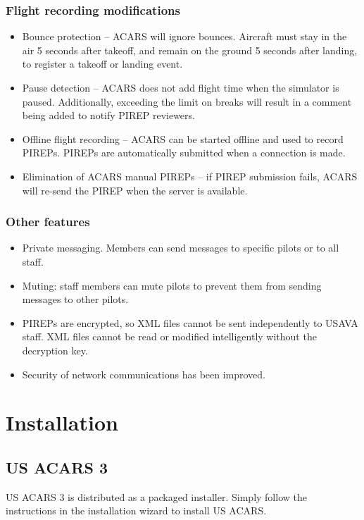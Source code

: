 \documentclass[12pt]{article}
\begin{document}
\subsubsection*{Flight recording modifications}
\begin{itemize}
\item{Bounce protection – ACARS will ignore bounces. Aircraft must stay in the air 5 seconds after takeoff, and remain on the ground 5 seconds after landing, to register a takeoff or landing event.}
\item{Pause detection – ACARS does not add flight time when the simulator is paused. Additionally, exceeding the limit on breaks will result in a comment being added to notify PIREP reviewers.}
\item{Offline flight recording – ACARS can be started offline and used to record PIREPs. PIREPs are automatically submitted when a connection is made.}
\item{Elimination of ACARS manual PIREPs – if PIREP submission fails, ACARS will re-send the PIREP when the server is available.} 
\end{itemize}

\subsubsection*{Other features}
\begin{itemize}
\item{Private messaging. Members can send messages to specific pilots or to all staff.}
\item{Muting: staff members can mute pilots to prevent them from sending messages to other pilots.}
\item{PIREPs are encrypted, so XML files cannot be sent independently to USAVA staff. XML files cannot be read or modified intelligently without the decryption key.}
\item{Security of network communications has been improved.}
\end{itemize}

\section{Installation}

\subsection{US ACARS 3}
US ACARS 3 is distributed as a packaged installer. Simply follow the instructions in the installation wizard to install US ACARS.
\end{document}
